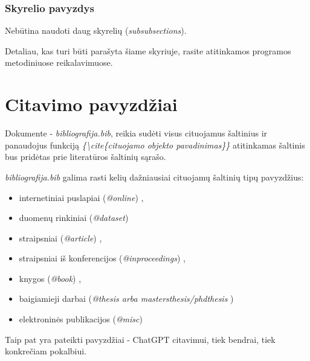 \documentclass[]{VUMIFTemplateClass}
\begin{document}
\subsubsection{Skyrelio pavyzdys}
\noindent Nebūtina naudoti daug skyrelių (\textit{subsubsections}).

Detaliau, kas turi būti parašyta šiame skyriuje, rasite atitinkamos programos metodiniuose reikalavimuose. 

\printbibliography[title = {Literatūra ir šaltiniai}]


\appendix
\renewcommand{\thesection}{\arabic{section} priedas.}

\section{\phantom{Priedas} Citavimo pavyzdžiai}
Dokumente - \textit{bibliografija.bib}, reikia sudėti visus cituojamus šaltinius ir panaudojus funkciją \textit{\{\textbackslash cite\{cituojamo objekto pavadinimas\}\}} atitinkamas šaltinis bus pridėtas prie literatūros šaltinių sąrašo.


\textit{bibliografija.bib} galima rasti kelių dažniausiai cituojamų šaltinių tipų pavyzdžius:
\begin{itemize}
    \item internetiniai puslapiai (\textit{@online}) \cite{PvzInternetinisPuslapis},
    \item duomenų rinkiniai (\textit{@dataset}) \cite{dataset}
    \item straipsniai (\textit{@article}) \cite{PvzStraipsnLt, PvzStraipsnEn}, 
    \item straipsniai iš konferencijos (\textit{@inproceedings}) \cite{PvzKonfLt, PvzKonfEn}, 
    \item knygos (\textit{@book}) \cite{PvzKnygLt, PvzKnygEn}, 
    \item baigiamieji darbai (\textit{@thesis arba mastersthesis/phdthesis} \cite{PvzMagistrLt, PvzPhdEn})
    \item elektroninės publikacijos (\textit{@misc}) \cite{PvzElPubLt, PvzElPubEn}
\end{itemize}

Taip pat yra pateikti pavyzdžiai - ChatGPT citavimui, tiek bendrai\cite{chatgpt_bendrai}, tiek konkrečiam pokalbiui\cite{chatgpt_pokalbis}.
\end{document}
